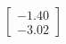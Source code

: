 \documentclass[preview]{standalone}
\begin{document}
\begin{align*}
\begin{bmatrix} -1.40 \\ -3.02 \end{bmatrix}
\end{align*}
\end{document}
